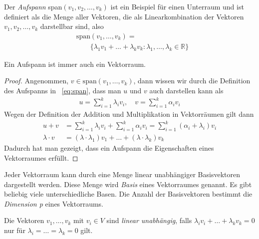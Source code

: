 Der \emph{Aufspann} span$(v_1, v_2,\dots,v_k)$ ist ein Beispiel für einen Unterraum und ist definiert als die Menge aller Vektoren, die als Linearkombination der Vektoren $v_1, v_2, \dots, v_k$ darstellbar sind, also
\begin{align}
\label{eq:span}
&\text{span}(v_1,\dots,v_k) =\\ &\qquad \{\lambda_1v_1+\dots+\lambda_kv_k : \lambda_1, \dots, \lambda_k \in \mathbb{R}\} \nonumber
\end{align}



\begin{theorem}
Ein Aufspann ist immer auch ein Vektorraum.
\end{theorem}
\begin{proof} 
Angenommen, $v \in \text{span}(v_1,\dots,v_k)$,
dann wissen wir durch die Definition des Aufspanns in ~\eqref{eq:span}, dass man $u$ und $v$ auch darstellen kann als
\begin{align*}
u = \sum\limits_{i=1}^{k} \lambda_iv_i, \quad v = \sum\limits_{i=1}^{k} \alpha_iv_i
\end{align*}
Wegen der Definition der Addition und Multiplikation in Vektorr\"aumen gilt dann
\begin{align*}
	u + v &= \sum\limits_{i=1}^{k} \lambda_iv_i + \sum\limits_{i=1}^{k} \alpha_iv_i= \sum\limits_{i=1}^{k} (\alpha_i+\lambda_i)v_i\\
	\lambda\cdot v &= (\lambda \cdot \lambda_1) v_1+\dots+(\lambda \cdot \lambda_k)v_k
\end{align*}
Dadurch hat man gezeigt, dass ein Aufspann die Eigenschaften eines Vektorraumes erf\"ullt.
\end{proof}
Jeder Vektorraum kann durch eine Menge linear unabh\"angiger Basisvektoren dargestellt werden. Diese Menge wird \textit{Basis} eines Vektorraumes genannt. Es gibt beliebig viele unterschiedliche Basen. Die Anzahl der Basisvektoren bestimmt die \textit{Dimension p} eines Vektorraums.

Die Vektoren $v_1,\dots,v_k$ mit $v_i \in V$ sind \textit{linear unabh\"angig}, falls $\lambda_iv_i+\dots+\lambda_kv_k = 0$ nur f\"ur $\lambda_i=\dots=\lambda_k= 0$ gilt. 

%
